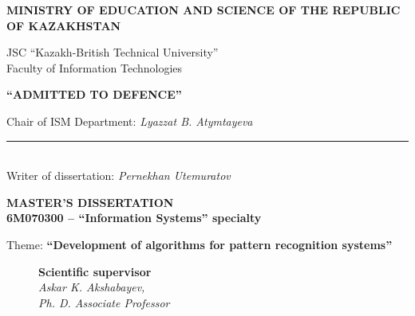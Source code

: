 \begin{titlepage}
    \pagestyle{empty}
    \begin{center}
        {\bf{\MakeUppercase{Ministry of education and science of the republic of Kazakhstan}}

        \vspace{14pt}

        JSC ``Kazakh-British Technical University''\\
        Faculty of Information Technologies}
       
       \vspace{14pt}
       
        \begin{flushright}
            {\bf \MakeUppercase{``Admitted to defence''}}

            Chair of ISM Department: {\em Lyazzat B. Atymtayeva}\\
            \vspace{0.5\baselineskip}
            \rule{13em}{0.4pt}\\
            \vspace{14pt}
          Writer of dissertation: {\em Pernekhan Utemuratov}
          \vspace{14pt}
        \end{flushright}
        
        {\bf
        \MakeUppercase{Master's Dissertation}\\
        6M070300 -- ``Information Systems'' specialty}

        \vspace{14pt}

        Theme: {\bf ``Development of algorithms for pattern recognition systems''}
        
        \vspace{28pt}
        
        \begin{figure}[ht]
            \begin{minipage}[t]{0.6\linewidth}
                {\bf Scientific supervisor}\\

                {\em Askar K. Akshabayev,\\
                Ph. D. Associate Professor}\\
            \end{minipage}
        \end{figure}


\end{center}
\end{titlepage}
